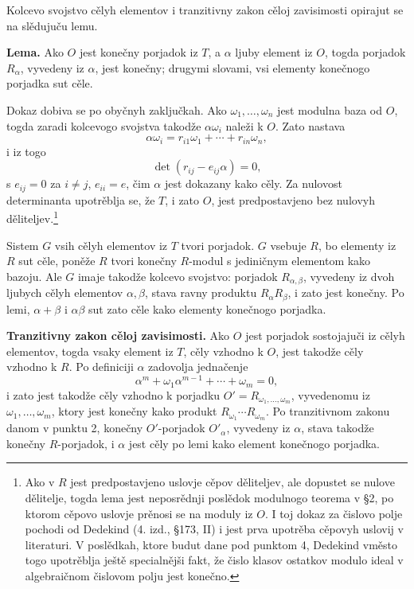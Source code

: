 \documentclass[11pt]{article}
\begin{document}
Kolcevo svojstvo cělyh elementov i tranzitivny zakon cěloj zavisimosti opirajut se na slědujuču lemu.

\medskip
\noindent\textbf{Lema.} Ako $O$ jest konečny porjadok iz $T$, a $\alpha$ ljuby element iz $O$, togda porjadok $R_\alpha$, vyvedeny iz $\alpha$, jest konečny; drugymi slovami, vsi elementy konečnogo porjadka sut cěle.

Dokaz dobiva se po obyčnyh zaključkah. Ako $\omega_1,\ldots,\omega_n$ jest modulna baza od $O$, togda zaradi kolcevogo svojstva takodže $\alpha\omega_i$ naleži k $O$. Zato nastava
\[
        \alpha\omega_i=r_{i1}\omega_1+\cdots+r_{in}\omega_n,
\]
i iz togo
\[
        \det(r_{ij}-e_{ij}\alpha)=0,
\]
s $e_{ij}=0$ za $i\ne j$, $e_{ii}=e$, čim $\alpha$ jest dokazany kako cěly. Za nulovost determinanta upotrěblja se, že $T$, i zato $O$, jest predpostavjeno bez nulovyh děliteljev.\footnote{Ako v $R$ jest predpostavjeno uslovje cěpov děliteljev, ale dopustet se nulove dělitelje, togda lema jest neposrědnji poslědok modulnogo teorema v §2, po ktorom cěpovo uslovje prěnosi se na moduly iz $O$. I toj dokaz za čislovo polje pochodi od Dedekind (4. izd., §173, II) i jest prva upotrěba cěpovyh uslovij v literaturi. V poslědkah, ktore budut dane pod punktom 4, Dedekind vměsto togo upotrěblja ještě specialnějši fakt, že čislo klasov ostatkov modulo ideal v algebraičnom čislovom polju jest konečno.}

Sistem $G$ vsih cělyh elementov iz $T$ tvori porjadok. $G$ vsebuje $R$, bo elementy iz $R$ sut cěle, poněže $R$ tvori konečny $R$-modul s jediničnym elementom kako bazoju. Ale $G$ imaje takodže kolcevo svojstvo: porjadok $R_{\alpha,\beta}$, vyvedeny iz dvoh ljubych cělyh elementov $\alpha,\beta$, stava ravny produktu $R_\alpha R_\beta$, i zato jest konečny. Po lemi, $\alpha+\beta$ i $\alpha\beta$ sut zato cěle kako elementy konečnogo porjadka.

\medskip
\noindent\textbf{Tranzitivny zakon cěloj zavisimosti.} Ako $O$ jest porjadok sostojajuči iz cělyh elementov, togda vsaky element iz $T$, cěly vzhodno k $O$, jest takodže cěly vzhodno k $R$. Po definiciji $\alpha$ zadovolja jednačenje
\[
        \alpha^m+\omega_1\alpha^{m-1}+\cdots+\omega_m=0,
\]
i zato jest takodže cěly vzhodno k porjadku $O'=R_{\omega_1,\ldots,\omega_m}$, vyvedenomu iz $\omega_1,\ldots,\omega_m$, ktory jest konečny kako produkt $R_{\omega_1}\cdots R_{\omega_m}$. Po tranzitivnom zakonu danom v punktu 2, konečny $O'$-porjadok $O'_\alpha$, vyvedeny iz $\alpha$, stava takodže konečny $R$-porjadok, i $\alpha$ jest cěly po lemi kako element konečnogo porjadka.
\end{document}

